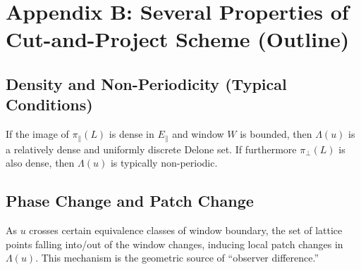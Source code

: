 \section{Appendix B: Several Properties of Cut-and-Project Scheme (Outline)}
\label{app:cut-project-properties}

\subsection{Density and Non-Periodicity (Typical Conditions)}

If the image of $\pi_{\parallel}(L)$ is dense in $E_{\parallel}$ and window $W$ is bounded, then $\Lambda(u)$ is a relatively dense and uniformly discrete Delone set. If furthermore $\pi_{\perp}(L)$ is also dense, then $\Lambda(u)$ is typically non-periodic.

\subsection{Phase Change and Patch Change}

As $u$ crosses certain equivalence classes of window boundary, the set of lattice points falling into/out of the window changes, inducing local patch changes in $\Lambda(u)$. This mechanism is the geometric source of ``observer difference.''
